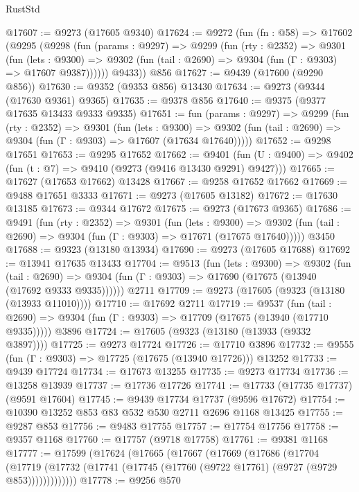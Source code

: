 \begin{lexlean}{RustStd}
\begin{coremodule}
{\begin{coremodule}
{{{{{{{{{{{{{{{{{{{{{{{{{{{{{{{{{{{{{{{{{{{{{{{{{{{{{{{@17607 := @9273 (@17605 @9340)
@17624 := @9272
    (fun (fn : @58) =>
    @17602
      (@9295
        (@9298
          (fun (params : @9297) =>
          @9299
            (fun (rty : @2352) =>
            @9301
              (fun (lets : @9300) =>
              @9302 (fun (tail : @2690) => @9304 (fun (Γ : @9303) => @17607 @9387))))))
        @9433))
    @856
@17627 := @9439 (@17600 (@9290 @856))
@17630 := @9352 (@9353 @856) @13430
@17634 := @9273 (@9344 (@17630 @9361) @9365)
@17635 := @9378 @856
@17640 := @9375 (@9377 @17635 @13433 @9333 @9335)
@17651 := fun (params : @9297) =>
  @9299
    (fun (rty : @2352) =>
    @9301
      (fun (lets : @9300) =>
      @9302 (fun (tail : @2690) => @9304 (fun (Γ : @9303) => @17607 (@17634 @17640)))))
@17652 := @9298 @17651
@17653 := @9295 @17652
@17662 := @9401
    (fun (U : @9400) => @9402 (fun (t : @7) => @9410 (@9273 (@9416 @13430 @9291) @9427)))
@17665 := @17627 (@17653 @17662) @13428
@17667 := @9258 @17652 @17662
@17669 := @9488 @17651 @3333
@17671 := @9273 (@17605 @13182)
@17672 := @17630 @13185
@17673 := @9344 @17672
@17675 := @9273 (@17673 @9365)
@17686 := @9491
    (fun (rty : @2352) =>
    @9301
      (fun (lets : @9300) =>
      @9302 (fun (tail : @2690) => @9304 (fun (Γ : @9303) => @17671 (@17675 @17640)))))
    @3450
@17688 := @9323 (@13180 @13934)
@17690 := @9273 (@17605 @17688)
@17692 := @13941 @17635 @13433
@17704 := @9513
    (fun (lets : @9300) =>
    @9302
      (fun (tail : @2690) =>
      @9304 (fun (Γ : @9303) => @17690 (@17675 (@13940 (@17692 @9333 @9335))))))
    @2711
@17709 := @9273 (@17605 (@9323 (@13180 (@13933 @11010))))
@17710 := @17692 @2711
@17719 := @9537
    (fun (tail : @2690) => @9304 (fun (Γ : @9303) => @17709 (@17675 (@13940 (@17710 @9335)))))
    @3896
@17724 := @17605 (@9323 (@13180 (@13933 (@9332 @3897))))
@17725 := @9273 @17724
@17726 := @17710 @3896
@17732 := @9555 (fun (Γ : @9303) => @17725 (@17675 (@13940 @17726))) @13252
@17733 := @9439 @17724
@17734 := @17673 @13255
@17735 := @9273 @17734
@17736 := @13258 @13939
@17737 := @17736 @17726
@17741 := @17733 (@17735 @17737) (@9591 @17604)
@17745 := @9439 @17734 @17737 (@9596 @17672)
@17754 := @10390 @13252 @853 @83 @532 @530 @2711 @2696 @1168 @13425
@17755 := @9287 @853
@17756 := @9483 @17755
@17757 := @17754 @17756
@17758 := @9357 @1168
@17760 := @17757 (@9718 @17758)
@17761 := @9381 @1168
@17777 := @17599
    (@17624
      (@17665
        (@17667
          (@17669
            (@17686
              (@17704
                (@17719
                  (@17732 (@17741 (@17745 (@17760 (@9722 @17761) (@9727 (@9729 @853)))))))))))))
@17778 := @9256 @570
}}}}}}}}}}}}}}}}}}}}}}}}}}}}}}}}}}}}}}}}}}}}}}}}}}}}}}}
\end{coremodule}}
\end{coremodule}
\end{lexlean}
